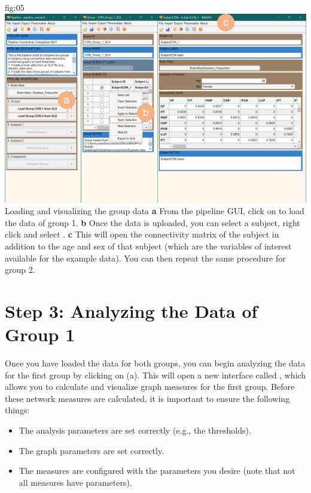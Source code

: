 \documentclass[justified]{tufte-handout}
\begin{document}
{fig:05}
{
	\includegraphics{fig05.jpg}
}
{Loading and visualizing the group data}
{
	{\bf a} From the pipeline GUI, click on  to load the data of group 1.
	{\bf b} Once the data is uploaded, you can select a subject, right click and select .
	{\bf c} This will open the connectivity matrix of the subject in addition to the age and sex of that subject (which are the variables of interest available for the example data).
	You can then repeat the same procedure for group 2.
}


\clearpage
\section{Step 3: Analyzing the Data of Group 1}

Once you have loaded the data for both groups, you can begin analyzing the data for the first group by clicking on  (a). 
This will open a new interface called , which allows you to calculate and visualize graph measures for the first group. 
Before these network measures are calculated, it is important to ensure the following things: 
\begin{itemize}

\item The analysis parameters are set correctly (e.g., the thresholds).

\item The graph parameters are set correctly.

\item The measures are configured with the parameters you desire (note that not all measures have parameters).

\end{itemize}
\end{document}
